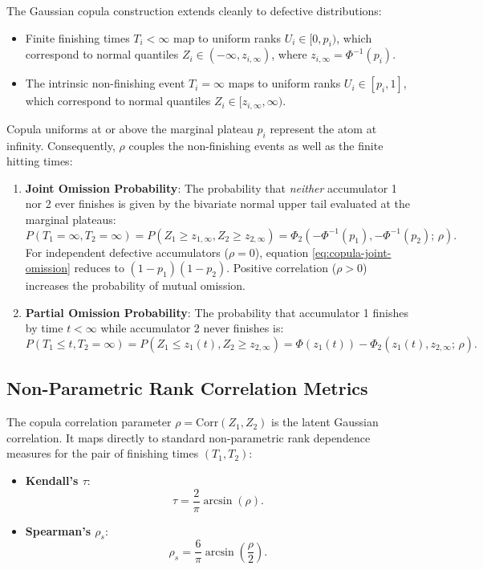 \documentclass[12pt]{article}
\newcommand{\PhiN}{\Phi}
\newcommand{\PhiTwo}{\Phi_2}
\begin{document}
The Gaussian copula construction extends cleanly to defective distributions:
\begin{itemize}
  \item Finite finishing times $T_i < \infty$ map to uniform ranks $U_i \in [0, p_i)$, which correspond to normal quantiles $Z_i \in (-\infty, z_{i, \infty})$, where $z_{i, \infty} = \PhiN^{-1}(p_i)$.
  \item The intrinsic non-finishing event $T_i = \infty$ maps to uniform ranks $U_i \in [p_i, 1]$, which correspond to normal quantiles $Z_i \in [z_{i, \infty}, \infty)$.
\end{itemize}
Copula uniforms at or above the marginal plateau $p_i$ represent the atom at infinity. Consequently, $\rho$ couples the non-finishing events as well as the finite hitting times:
\begin{enumerate}
  \item \textbf{Joint Omission Probability}: The probability that \emph{neither} accumulator 1 nor 2 ever finishes is given by the bivariate normal upper tail evaluated at the marginal plateaus:
  \begin{equation}
    P(T_1 = \infty, T_2 = \infty) = P(Z_1 \ge z_{1, \infty}, Z_2 \ge z_{2, \infty}) = \PhiTwo\!\left(-\PhiN^{-1}(p_1), -\PhiN^{-1}(p_2);\, \rho\right).
    \label{eq:copula-joint-omission}
  \end{equation}
  For independent defective accumulators ($\rho = 0$), equation \eqref{eq:copula-joint-omission} reduces to $(1 - p_1)(1 - p_2)$. Positive correlation ($\rho > 0$) increases the probability of mutual omission.
  \item \textbf{Partial Omission Probability}: The probability that accumulator 1 finishes by time $t < \infty$ while accumulator 2 never finishes is:
  \begin{equation}
    P(T_1 \le t, T_2 = \infty) = P(Z_1 \le z_1(t), Z_2 \ge z_{2, \infty}) = \PhiN(z_1(t)) - \PhiTwo\!\left(z_1(t), z_{2, \infty};\, \rho\right).
    \label{eq:copula-partial-omission}
  \end{equation}
\end{enumerate}

\subsection{Non-Parametric Rank Correlation Metrics}
The copula correlation parameter $\rho = \mathrm{Corr}(Z_1, Z_2)$ is the latent Gaussian correlation. It maps directly to standard non-parametric rank dependence measures for the pair of finishing times $(T_1, T_2)$:
\begin{itemize}
  \item \textbf{Kendall's $\tau$}:
  \begin{equation}
    \tau = \frac{2}{\pi} \arcsin(\rho).
  \end{equation}
  \item \textbf{Spearman's $\rho_s$}:
  \begin{equation}
    \rho_s = \frac{6}{\pi} \arcsin\!\left(\frac{\rho}{2}\right).
  \end{equation}
\end{itemize}
\end{document}
